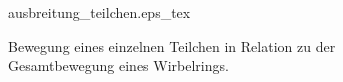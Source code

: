 \begin{figure}
\centering
\def\svgwidth{0.4\columnwidth}
{ausbreitung_teilchen.eps_tex}
\caption{Bewegung eines einzelnen Teilchen in Relation zu der Gesamtbewegung eines Wirbelrings. \label{Wirbelringe:fig:ausbreitung_teilchen}}
\end{figure}